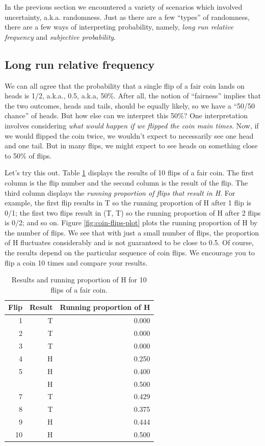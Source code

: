 \documentclass[
]{book}
\theoremstyle{definition}
\theoremstyle{definition}
\theoremstyle{definition}
\theoremstyle{remark}
\begin{document}
In the previous section we encountered a variety of scenarios which involved uncertainty, a.k.a. randomness. Just as there are a few ``types'' of randomness, there are a few ways of interpreting probability, namely, \emph{long run relative frequency} and \emph{subjective probability}.

\hypertarget{rel-freq}{%
\subsection{Long run relative frequency}\label{rel-freq}}

We can all agree that the probability that a single flip of a fair coin lands on heads is 1/2, a.k.a., 0.5, a.k.a, 50\%. After all, the notion of ``fairness'' implies that the two outcomes, heads and tails, should be equally likely, so we have a ``50/50 chance'' of heads. But how else can we interpret this 50\%? One interpretation involves considering \emph{what would happen if we flipped the coin main times}. Now, if we would flipped the coin twice, we wouldn't expect to necessarily see one head and one tail. But in many flips, we might expect to see heads on something close to 50\% of flips.

Let's try this out. Table \ref{tab:coin-flips} displays the results of 10 flips of a fair coin. The first column is the flip number and the second column is the result of the flip. The third column displays the \emph{running proportion of flips that result in H}. For example, the first flip results in T so the running proportion of H after 1 flip is 0/1; the first two flips result in (T, T) so the running proportion of H after 2 flips is 0/2; and so on. Figure \ref{fig:coin-flips-plot} plots the running proportion of H by the number of flips. We see that with just a small number of flips, the proportion of H fluctuates considerably and is not guaranteed to be close to 0.5. Of course, the results depend on the particular sequence of coin flips. We encourage you to flip a coin 10 times and compare your results.



\begin{table}

\caption{\label{tab:coin-flips}Results and running proportion of H for 10 flips of a fair coin.}
\centering
\begin{tabular}[t]{rrr}
\toprule
Flip & Result & Running proportion of H\\
\midrule
1 & T & 0.000\\
2 & T & 0.000\\
3 & T & 0.000\\
4 & H & 0.250\\
5 & H & 0.400\\
\addlinespace
6 & H & 0.500\\
7 & T & 0.429\\
8 & T & 0.375\\
9 & H & 0.444\\
10 & H & 0.500\\
\bottomrule
\end{tabular}
\end{table}
\end{document}
